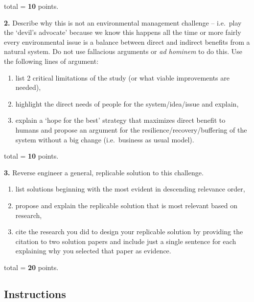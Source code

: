 \documentclass[
]{book}
\providecommand{\tightlist}{%
  \setlength{\itemsep}{0pt}\setlength{\parskip}{0pt}}
\begin{document}
total = \textbf{10} points.

\textbf{2.} Describe why this is not an environmental management challenge -- i.e.~play the `devil's advocate' because we know this happens all the time or more fairly every environmental issue is a balance between direct and indirect benefits from a natural system. Do not use fallacious arguments or \emph{ad hominem} to do this. Use the following lines of argument:

\begin{enumerate}
\def\labelenumi{(\alph{enumi})}
\tightlist
\item
  list 2 critical limitations of the study (or what viable improvements are needed),\\
\item
  highlight the direct needs of people for the system/idea/issue and explain,\\
\item
  explain a `hope for the best' strategy that maximizes direct benefit to humans and propose an argument for the resilience/recovery/buffering of the system without a big change (i.e.~business as usual model).
\end{enumerate}

total = \textbf{10} points.

\textbf{3.} Reverse engineer a general, replicable solution to this challenge.

\begin{enumerate}
\def\labelenumi{(\alph{enumi})}
\tightlist
\item
  list solutions beginning with the most evident in descending relevance order,\\
\item
  propose and explain the replicable solution that is most relevant based on research,\\
\item
  cite the research you did to design your replicable solution by providing the citation to two solution papers and include just a single sentence for each explaining why you selected that paper as evidence.
\end{enumerate}

total = \textbf{20} points.

\hypertarget{instructions-1}{%
\subsection*{Instructions}\label{instructions-1}}
\end{document}
